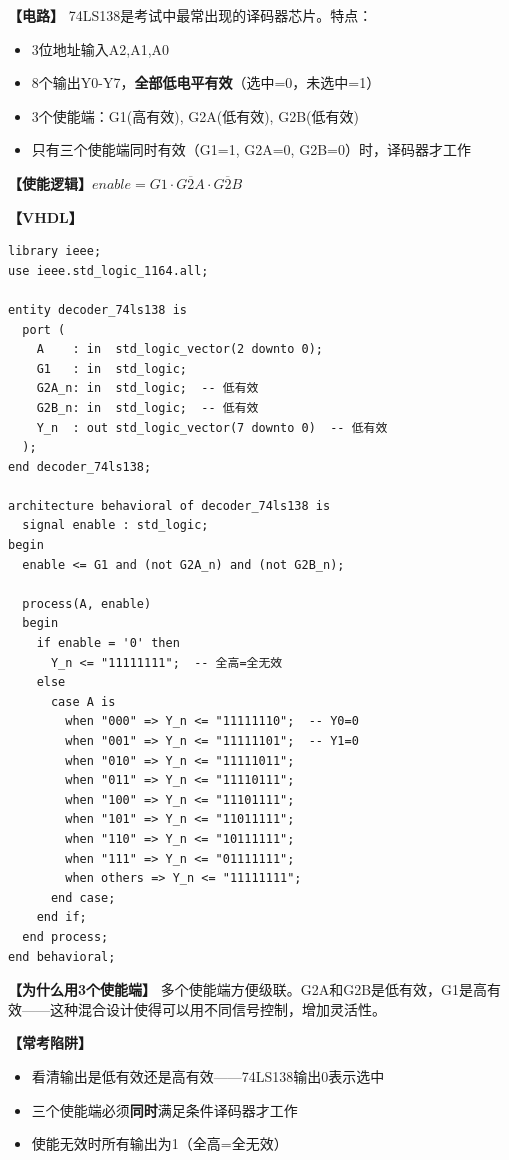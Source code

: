 \begin{detailbox}[完整教学]

\textbf{【电路】}
74LS138是考试中最常出现的译码器芯片。特点：
\begin{itemize}
  \item 3位地址输入A2,A1,A0
  \item 8个输出Y0-Y7，\textbf{全部低电平有效}（选中=0，未选中=1）
  \item 3个使能端：G1(高有效), G2A(低有效), G2B(低有效)
  \item 只有三个使能端同时有效（G1=1, G2A=0, G2B=0）时，译码器才工作
\end{itemize}

\textbf{【使能逻辑】}$enable = G1 \cdot \overline{G2A} \cdot \overline{G2B}$

\textbf{【VHDL】}
\begin{lstlisting}
library ieee;
use ieee.std_logic_1164.all;

entity decoder_74ls138 is
  port (
    A    : in  std_logic_vector(2 downto 0);
    G1   : in  std_logic;
    G2A_n: in  std_logic;  -- 低有效
    G2B_n: in  std_logic;  -- 低有效
    Y_n  : out std_logic_vector(7 downto 0)  -- 低有效
  );
end decoder_74ls138;

architecture behavioral of decoder_74ls138 is
  signal enable : std_logic;
begin
  enable <= G1 and (not G2A_n) and (not G2B_n);

  process(A, enable)
  begin
    if enable = '0' then
      Y_n <= "11111111";  -- 全高=全无效
    else
      case A is
        when "000" => Y_n <= "11111110";  -- Y0=0
        when "001" => Y_n <= "11111101";  -- Y1=0
        when "010" => Y_n <= "11111011";
        when "011" => Y_n <= "11110111";
        when "100" => Y_n <= "11101111";
        when "101" => Y_n <= "11011111";
        when "110" => Y_n <= "10111111";
        when "111" => Y_n <= "01111111";
        when others => Y_n <= "11111111";
      end case;
    end if;
  end process;
end behavioral;
\end{lstlisting}

\textbf{【为什么用3个使能端】}
多个使能端方便级联。G2A和G2B是低有效，G1是高有效——这种混合设计使得可以用不同信号控制，增加灵活性。

\textbf{【常考陷阱】}
\begin{itemize}
  \item 看清输出是低有效还是高有效——74LS138输出0表示选中
  \item 三个使能端必须\textbf{同时}满足条件译码器才工作
  \item 使能无效时所有输出为1（全高=全无效）
\end{itemize}

\end{detailbox}


